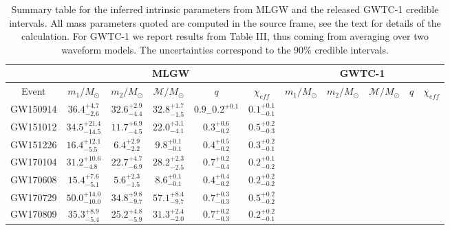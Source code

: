 \begin{table}[]
\centering
\caption{Summary table for the inferred intrinsic parameters from MLGW and the released GWTC-1 credible intervals. All mass parameters quoted are computed in the source frame, see the text for details of the calculation. For GWTC-1 we report results from Table III, thus coming from averaging over two waveform models. The uncertainties correspond to the 90\% credible intervals.}
\label{tab:summary}
\begin{tabular}{cccccc|ccccc}
                              & \multicolumn{5}{c}{MLGW}                                                   & \multicolumn{5}{c|}{GWTC-1}                                                \\ \hline
\multicolumn{1}{c|}{Event}    & $m_1/M_\odot$ & $m_2/M_\odot$ & $\mathcal{M}/M_\odot$ & $q$ & $\chi_{eff}$ & $m_1/M_\odot$ & $m_2/M_\odot$ & $\mathcal{M}/M_\odot$ & $q$ & $\chi_{eff}$ \\ \hline
\multicolumn{1}{c|}{GW150914} & $36.4_{-2.6}^{+4.7}$& $32.6_{-4.4}^{+2.9}$& $32.8_{-1.5}^{+1.7}$& $0.9_-{0.2}^{+0.1}$& $0.1_{-0.1}^{+0.1}$&               &               &                       &     &              \\
\multicolumn{1}{c|}{GW151012} & $34.5_{-14.5}^{+21.4}$& $11.7_{-4.5}^{+6.9}$& $22.0_{-4.1}^{+3.1}$& $0.3_{-0.2}^{+0.6}$& $0.5_{-0.3}^{+0.2}$&               &               &                       &     &              \\
\multicolumn{1}{c|}{GW151226} & $16.4_{-5.5}^{+12.1}$& $6.4_{-2.2}^{+2.9}$& $9.8_{-0.1}^{+0.1}$& $0.4_{-0.2}^{+0.5}$& $0.3_{-0.1}^{+0.2}$&               &               &                       &     &              \\
\multicolumn{1}{c|}{GW170104} & $31.2_{-4.8}^{+10.6}$& $22.7_{-6.9}^{+4.7}$& $28.2_{-2.5}^{+2.3}$& $0.7_{-0.4}^{+0.2}$& $0.2_{-0.2}^{+0.1}$&               &               &                       &     &              \\
\multicolumn{1}{c|}{GW170608} & $15.4_{-5.1}^{+7.6}$& $5.6_{-1.5}^{+2.3}$& $8.6_{-0.1}^{+0.1}$& $0.4_{-0.2}^{+0.4}$& $0.2_{-0.2}^{+0.2}$&               &               &                       &     &              \\
\multicolumn{1}{c|}{GW170729} & $50.0_{-10.0}^{+14.0}$& $34.8_{-9.7}^{+9.8}$& $57.1_{-9.7}^{+8.4}$& $0.7_{-0.3}^{+0.3}$& $0.5_{-0.2}^{+0.2}$&               &               &                       &     &              \\
\multicolumn{1}{c|}{GW170809} & $35.3_{-5.4}^{+8.9}$& $25.2_{-5.9}^{+4.8}$& $31.3_{-2.0}^{+2.4}$& $0.7_{-0.3}^{+0.2}$& $0.2_{-0.1}^{+0.2}$&               &               &                       &     &              \\

\end{tabular}
\end{table}
